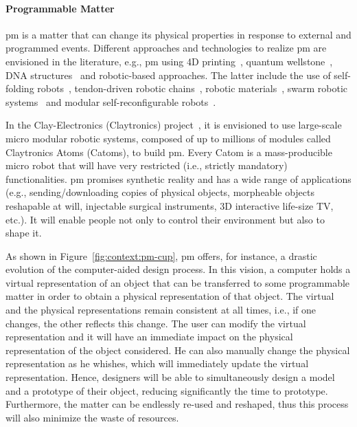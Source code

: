 \paragraph{Programmable Matter}

\acrfull{pm} is a matter that can change its physical properties in response to external and programmed events. Different approaches and technologies to realize \gls{pm} are envisioned in the literature, e.g., \gls{pm} using 4D printing~\cite{tibbits20144d}, quantum wellstone~\cite{carthy2000programmable}, DNA structures~\cite{ke2012three,kim2011dna} and robotic-based approaches. The latter include the use of self-folding robots~\cite{Hawkes13072010}, tendon-driven robotic chains~\cite{lasagni2016dynamic}, robotic materials~\cite{mcevoy2015materials}, swarm robotic systems~\cite{rubenstein2014programmable} and modular self-reconfigurable robots~\cite{goldstein-waci04,GKR10}.

In the Clay-Electronics (Claytronics) project~\cite{goldstein-waci04}, it is envisioned to use large-scale micro modular robotic systems, composed of up to millions of modules called Claytronics Atoms (Catoms), to build \gls{pm}. Every Catom is a mass-producible micro robot that will have very restricted (i.e., strictly mandatory) functionalities. \gls{pm} promises synthetic reality and has a wide range of applications (e.g., sending/downloading copies of physical objects, morpheable objects reshapable at will, injectable surgical instruments, 3D interactive life-size TV, etc.). It will enable people not only to control their environment but also to shape it.

As shown in Figure~\ref{fig:context:pm-cup}, \gls{pm} offers, for instance, a drastic evolution of the computer-aided design process. In this vision, a computer holds a virtual representation of an object that can be transferred to some programmable matter in order to obtain a physical representation of that object. The virtual and the physical representations remain consistent at all times, i.e., if one changes, the other reflects this change. The user can modify the virtual representation and it will have an immediate impact on the physical representation of the object considered. He can also manually change the physical representation as he whishes, which will immediately update the virtual representation. Hence, designers will be able to simultaneously design a model and a prototype of their object, reducing significantly the time to prototype. Furthermore, the matter can be endlessly re-used and reshaped, thus this process will also minimize the waste of resources.

